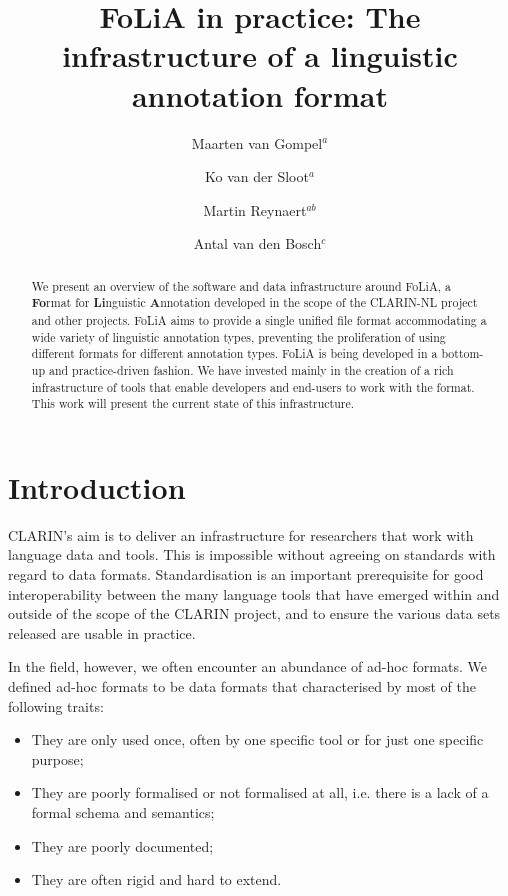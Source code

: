 \documentclass[a4paper,11pt]{article}
\begin{document}
\title{FoLiA in practice: The infrastructure of a linguistic annotation format}
\author{Maarten van Gompel$^a$ \and Ko van der
    Sloot$^a$ \and Martin Reynaert$^{ab}$ \and Antal van den Bosch$^c$} %
\date{}


\maketitle
\renewcommand{\thefootnote}{\alph{footnote}}
\renewcommand{\thefootnote}{\arabic{footnote}}

\begin{abstract}
We present an overview of the software and data infrastructure around FoLiA, a
\textbf{Fo}rmat for \textbf{Li}nguistic \textbf{A}nnotation developed in the
scope of the CLARIN-NL project and other projects.  FoLiA aims to provide a
single unified file format accommodating a wide variety of linguistic
annotation types, preventing the proliferation of using different formats for
different annotation types. FoLiA is being developed in a bottom-up and
practice-driven fashion.  We have invested mainly in the creation of a rich
infrastructure of tools that enable developers and end-users to work with the
format. This work will present the current state of this infrastructure.
\end{abstract}


\section{Introduction}

CLARIN's aim is to deliver an infrastructure for researchers that work with
language data and tools. This is impossible without agreeing on standards with
regard to data formats. Standardisation is an important prerequisite for good
interoperability between the many language tools that have emerged within and
outside of the scope of the CLARIN project, and to ensure the various data sets
released are usable in practice.

In the field, however, we often encounter an abundance of ad-hoc formats. We defined ad-hoc formats to be
data formats that characterised by most of the following traits:

\begin{itemize}
    \item They are only used once, often by one specific tool or for just one specific purpose;
    \item They are poorly formalised or not formalised at all, i.e. there is a lack of a formal schema and semantics;
    \item They are poorly documented;
    \item They are often rigid and hard to extend.
\end{itemize}
\end{document}
